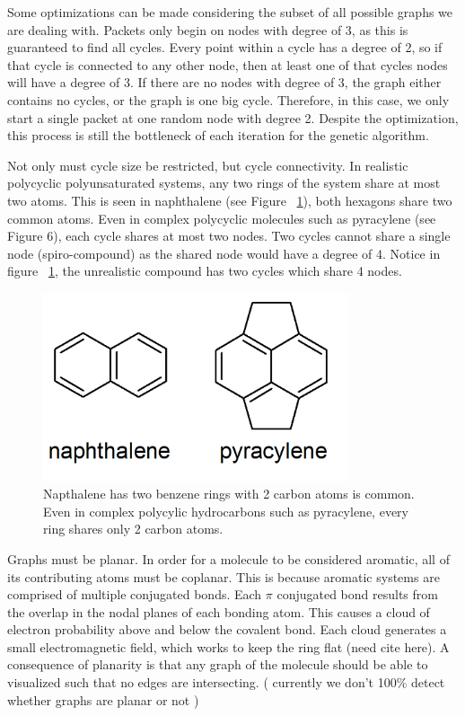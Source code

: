 \documentclass[12pt]{article}
\begin{document}
Some optimizations can be made considering the subset of all possible graphs we are dealing with. Packets only begin on nodes with degree of 3, as this is guaranteed to find all cycles. Every point within a cycle has a degree of 2, so if that cycle is connected to any other node, then at least one of that cycles nodes will have a degree of 3. If there are no nodes with degree of 3, the graph either contains no cycles, or the graph is one big cycle. Therefore, in this case, we only start a single packet at one random node with degree 2. Despite the optimization, this process is still the bottleneck of each iteration for the genetic algorithm.

Not only must cycle size be restricted, but cycle connectivity. In realistic polycyclic polyunsaturated systems, any two rings of the system share at most two atoms. This is seen in naphthalene (see Figure ~\ref{fig:polycyclic}), both hexagons share two common atoms. Even in complex polycyclic molecules such as pyracylene (see Figure 6), each cycle shares at most two nodes. Two cycles cannot share a single node (spiro-compound) as the shared node would have a degree of 4. Notice in figure ~\ref{fig:polycyclic}, the unrealistic compound has two cycles which share 4 nodes.

\begin{figure}[ht!]
\centering
\includegraphics[width=90mm]{polycyclic.png}
\caption{Napthalene has two benzene rings with 2 carbon atoms is common. Even in complex polycylic hydrocarbons such as pyracylene, every ring shares only 2 carbon atoms.}
\label{fig:polycyclic}
\end{figure}

Graphs must be planar. In order for a molecule to be considered aromatic, all of its contributing atoms must be coplanar. This is because aromatic systems are comprised of multiple conjugated bonds. Each $\pi$ conjugated bond results from the overlap in the nodal planes of each bonding atom. This causes a cloud of electron probability above and below the covalent bond. Each cloud generates a small electromagnetic field, which works to keep the ring flat (need cite here). A consequence of planarity is that any graph of the molecule should be able to visualized such that no edges are intersecting. (  currently we don't 100\% detect whether graphs are planar or not ) 
\end{document}
